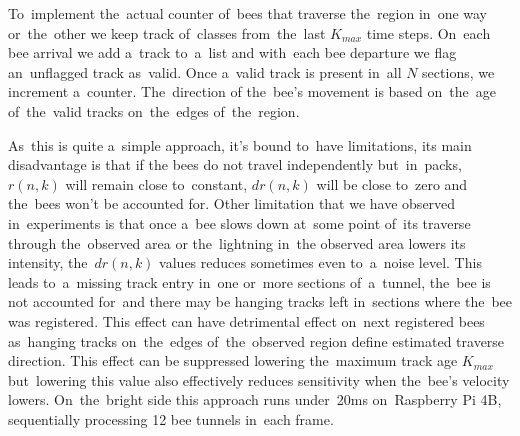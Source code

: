 To~implement the~actual counter of~bees that traverse the~region in~one way or~the~other we keep track of~classes from~the~last $K_{max}$ time steps. On~each bee arrival we add a~track to~a~list and with~each bee departure we flag an~unflagged track as~valid. Once a~valid track is present in~all $N$ sections, we increment a~counter. The~direction of the~bee's movement is based on~the~age of~the~valid tracks on~the~edges of~the~region.

As~this is quite a~simple approach, it's bound to~have limitations, its main disadvantage is that if the bees do not travel independently but~in~packs, $r(n,k)$ will remain close to~constant, $dr(n, k)$ will be close to~zero and the~bees won't be accounted for. Other limitation that we have observed in~experiments is that once a~bee slows down at~some point of~its traverse through the~observed area or the~lightning in~the observed area lowers its intensity, the~$dr(n, k)$ values reduces sometimes even to~a~noise level. This leads to~a~missing track entry in~one or~more sections of~a~tunnel, the~bee is not accounted for~and there may be hanging tracks left in~sections where the~bee was registered. This effect can have detrimental effect on~next registered bees as~hanging tracks on~the~edges of~the~observed region define estimated traverse direction. This effect can be suppressed lowering the~maximum track age $K_{max}$ but~lowering this value also effectively reduces sensitivity when the~bee's velocity lowers. On~the~bright side this approach runs under~20ms on~Raspberry Pi 4B, sequentially processing 12 bee tunnels in~each frame.
